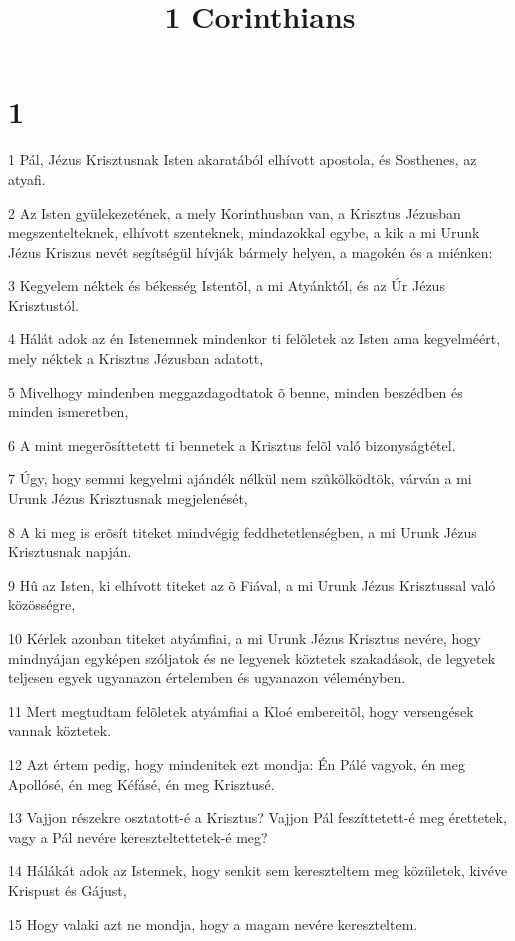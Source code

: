 

\title{1 Corinthians}


\chapter{1}

\par 1 Pál, Jézus Krisztusnak Isten akaratából elhívott apostola, és Sosthenes,  az atyafi.
\par 2 Az Isten gyülekezetének, a mely Korinthusban van, a Krisztus Jézusban megszentelteknek, elhívott szenteknek, mindazokkal egybe, a kik a mi Urunk Jézus Kriszus nevét segítségül hívják bármely helyen, a magokén és a miénken:
\par 3 Kegyelem néktek és békesség Istentõl, a mi Atyánktól, és az Úr Jézus Krisztustól.
\par 4 Hálát adok az én Istenemnek mindenkor ti felõletek az Isten ama kegyelméért, mely néktek a Krisztus Jézusban adatott,
\par 5 Mivelhogy mindenben meggazdagodtatok õ benne, minden beszédben és minden  ismeretben,
\par 6 A mint megerõsíttetett ti bennetek a Krisztus felõl való bizonyságtétel.
\par 7 Úgy, hogy semmi kegyelmi ajándék nélkül nem szûkölködtök, várván a mi Urunk Jézus  Krisztusnak megjelenését,
\par 8 A ki meg is erõsít titeket mindvégig  feddhetetlenségben, a mi Urunk Jézus Krisztusnak napján.
\par 9 Hû az Isten, ki elhívott  titeket az õ Fiával, a mi Urunk Jézus Krisztussal való közösségre,
\par 10 Kérlek azonban titeket atyámfiai, a mi Urunk Jézus Krisztus nevére, hogy mindnyájan egyképen szóljatok és ne legyenek köztetek szakadások, de legyetek teljesen egyek ugyanazon értelemben  és ugyanazon véleményben.
\par 11 Mert megtudtam felõletek atyámfiai a Kloé embereitõl, hogy versengések vannak köztetek.
\par 12 Azt értem pedig, hogy mindenitek ezt mondja: Én Pálé vagyok,  én meg Apollósé, én meg Kéfásé, én meg Krisztusé.
\par 13 Vajjon részekre osztatott-é a Krisztus? Vajjon Pál feszíttetett-é meg érettetek, vagy a Pál nevére kereszteltettetek-é meg?
\par 14 Hálákát adok az Istennek, hogy senkit sem kereszteltem meg közületek, kivéve Krispust  és Gájust,
\par 15 Hogy valaki azt ne mondja, hogy a magam nevére kereszteltem.
